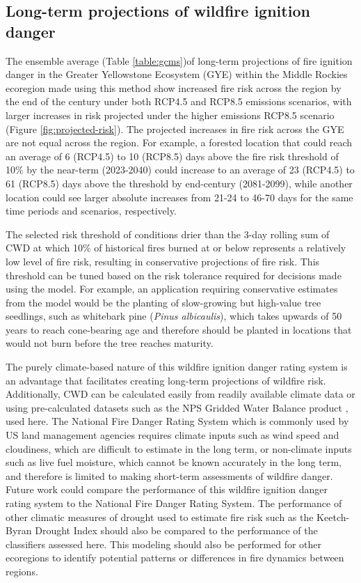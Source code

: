 \documentclass[11pt]{article}
\begin{document}
\subsection{Long-term projections of wildfire ignition danger}

The ensemble average (Table \ref{table:gcms})of long-term projections of fire ignition danger in the Greater Yellowstone Ecosystem (GYE) within the Middle Rockies ecoregion made using this method show increased fire risk across the region by the end of the century under both RCP4.5 and RCP8.5 emissions scenarios, with larger increases in risk projected under the higher emissions RCP8.5 scenario (Figure \ref{fig:projected-risk}). The projected increases in fire risk across the GYE are not equal across the region.  For example, a forested location that could reach an average of 6 (RCP4.5) to 10 (RCP8.5) days above the fire risk threshold of 10\% by the near-term (2023-2040) could increase to an average of 23 (RCP4.5) to 61 (RCP8.5) days above the threshold by end-century (2081-2099), while another location could see larger absolute increases from 21-24 to 46-70 days for the same time periods and scenarios, respectively.

The selected risk threshold of conditions drier than the 3-day rolling sum of CWD at which 10\% of historical fires burned at or below represents a relatively low level of fire risk, resulting in conservative projections of fire risk.  This threshold can be tuned based on the risk tolerance required for decisions made using the model.  For example, an application requiring conservative estimates from the model would be the planting of slow-growing but high-value tree seedlings, such as whitebark pine (\textit{Pinus albicaulis}), which takes upwards of 50 years to reach cone-bearing age and therefore should be planted in locations that would not burn before the tree reaches maturity.

The purely climate-based nature of this wildfire ignition danger rating system is an advantage that facilitates creating long-term projections of wildfire risk. Additionally, CWD can be calculated easily from readily available climate data or using pre-calculated datasets such as the NPS Gridded Water Balance product \citep{tercekHistoricalChangesPlant2021}, used here. The National Fire Danger Rating System \citep{degrootChapter11Wildland2015} which is commonly used by US land management agencies requires climate inputs such as wind speed and cloudiness, which are difficult to estimate in the long term, or non-climate inputs such as live fuel moisture, which cannot be known accurately in the long term, and therefore is limited to making short-term assessments of wildfire danger. Future work could compare the performance of this wildfire ignition danger rating system to the National Fire Danger Rating System. The performance of other climatic measures of drought used to estimate fire risk such as the Keetch-Byran Drought Index \citep{degrootChapter11Wildland2015} should also be compared to the performance of the classifiers assessed here.  This modeling should also be performed for other ecoregions to identify potential patterns or differences in fire dynamics between regions. 


\clearpage

\printbibliography[
heading=bibintoc,
title={References}
]
\end{document}
